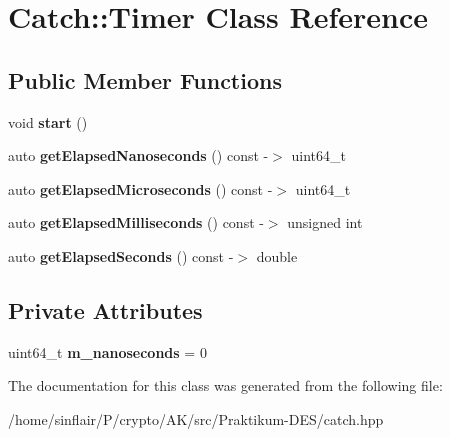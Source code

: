 \hypertarget{classCatch_1_1Timer}{}\section{Catch\+:\+:Timer Class Reference}
\label{classCatch_1_1Timer}
\subsection*{Public Member Functions}
\begin{DoxyCompactItemize}
\item 
\mbox{\label{classCatch_1_1Timer_a0a56e879e43f36c102bf9ea8b5fc8b72}} 
void {\bfseries start} ()
\item 
\mbox{\label{classCatch_1_1Timer_a57be5d17ca868a2d6fb1eea84de665cf}} 
auto {\bfseries get\+Elapsed\+Nanoseconds} () const -\/$>$ uint64\+\_\+t
\item 
\mbox{\label{classCatch_1_1Timer_a545de17a61a6fee1dbe3de5b0723e5fa}} 
auto {\bfseries get\+Elapsed\+Microseconds} () const -\/$>$ uint64\+\_\+t
\item 
\mbox{\label{classCatch_1_1Timer_a30aaf458dbb59dd8ac8971c9c62e0eac}} 
auto {\bfseries get\+Elapsed\+Milliseconds} () const -\/$>$ unsigned int
\item 
\mbox{\label{classCatch_1_1Timer_a065e37e3c9eb16bd4dcf41971d8deedc}} 
auto {\bfseries get\+Elapsed\+Seconds} () const -\/$>$ double
\end{DoxyCompactItemize}
\subsection*{Private Attributes}
\begin{DoxyCompactItemize}
\item 
\mbox{\label{classCatch_1_1Timer_ac13c1ef867cc3b9f942032d5ed79c2a7}} 
uint64\+\_\+t {\bfseries m\+\_\+nanoseconds} = 0
\end{DoxyCompactItemize}


The documentation for this class was generated from the following file\+:\begin{DoxyCompactItemize}
\item 
/home/sinflair/\+P/crypto/\+A\+K/src/\+Praktikum-\/\+D\+E\+S/catch.\+hpp\end{DoxyCompactItemize}
